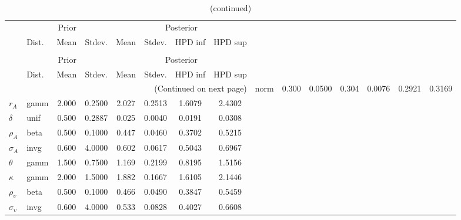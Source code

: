  
\begin{center}
\begin{longtable}{llcccccc} 
\caption{Results from Metropolis-Hastings (parameters)}
 \label{Table:MHPosterior:1}\\
\toprule 
  & \multicolumn{3}{c}{Prior}  &  \multicolumn{4}{c}{Posterior} \\
  \cmidrule(r{.75em}){2-4} \cmidrule(r{.75em}){5-8}
  & Dist. & Mean  & Stdev. & Mean & Stdev. & HPD inf & HPD sup\\
\midrule \endfirsthead 
\caption{(continued)}\\\toprule 
  & \multicolumn{3}{c}{Prior}  &  \multicolumn{4}{c}{Posterior} \\
  \cmidrule(r{.75em}){2-4} \cmidrule(r{.75em}){5-8}
  & Dist. & Mean  & Stdev. & Mean & Stdev. & HPD inf & HPD sup\\
\midrule \endhead 
\bottomrule \multicolumn{8}{r}{(Continued on next page)} \endfoot 
\bottomrule \endlastfoot 
${\alpha}$ & norm &   0.300 & 0.0500 &   0.304& 0.0076 &  0.2921 &  0.3169 \\ 
${r_{A}}$ & gamm &   2.000 & 0.2500 &   2.027& 0.2513 &  1.6079 &  2.4302 \\ 
${\delta}$ & unif &   0.500 & 0.2887 &   0.025& 0.0040 &  0.0191 &  0.0308 \\ 
${\rho_A}$ & beta &   0.500 & 0.1000 &   0.447& 0.0460 &  0.3702 &  0.5215 \\ 
${\sigma_A}$ & invg &   0.600 & 4.0000 &   0.602& 0.0617 &  0.5043 &  0.6967 \\ 
${\theta}$ & gamm &   1.500 & 0.7500 &   1.169& 0.2199 &  0.8195 &  1.5156 \\ 
${\kappa}$ & gamm &   2.000 & 1.5000 &   1.882& 0.1667 &  1.6105 &  2.1446 \\ 
${\rho_\upsilon}$ & beta &   0.500 & 0.1000 &   0.466& 0.0490 &  0.3847 &  0.5459 \\ 
${\sigma_\upsilon}$ & invg &   0.600 & 4.0000 &   0.533& 0.0828 &  0.4027 &  0.6608 \\ 
\end{longtable}
 \end{center}

